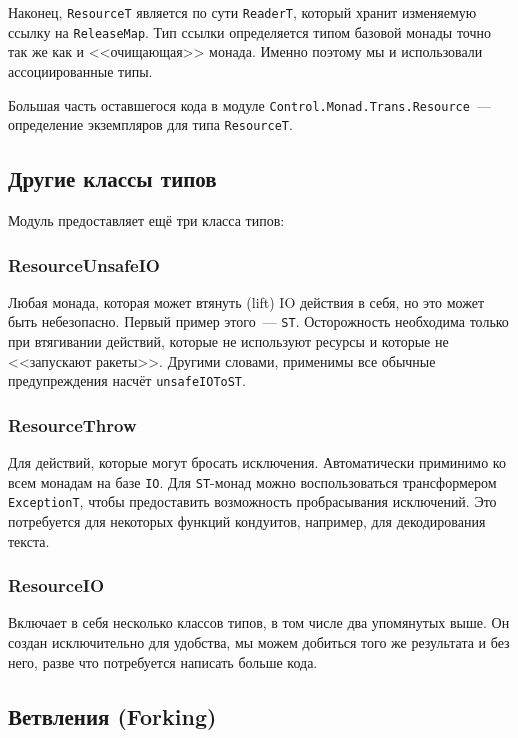 {Наконец, \lstinline'ResourceT' является по сути \lstinline'ReaderT', который
хранит изменяемую
ссылку на \lstinline'ReleaseMap'. Тип ссылки определяется типом базовой монады точно так же как и <<очищающая>> монада. Именно поэтому мы и использовали ассоциированные типы.

Большая часть оставшегося кода в модуле \lstinline'Control.Monad.Trans.Resource'~---
определение экземпляров для типа \lstinline'ResourceT'.

\subsection{Другие классы типов}

Модуль предоставляет ещё три класса типов:
   
\subsubsection{ResourceUnsafeIO}
Любая монада, которая может втянуть (lift) IO действия в себя, но это может быть небезопасно.
Первый пример этого~--- \lstinline'ST'. Осторожность необходима только при втягивании действий, которые не используют ресурсы и которые не <<запускают ракеты>>.
Другими словами, применимы все обычные предупреждения насчёт \lstinline'unsafeIOToST'.
  
\subsubsection{ResourceThrow}

Для действий, которые могут бросать исключения. Автоматически приминимо ко всем
монадам на базе \lstinline{IO}. Для \lstinline{ST}-монад можно воспользоваться трансформером
\lstinline'ExceptionT', чтобы
предоставить возможность пробрасывания исключений. Это потребуется для некоторых функций
кондуитов, например, для декодирования текста.
   
\subsubsection{ResourceIO}

Включает в себя несколько классов типов, в том числе два
упомянутых выше. Он создан исключительно для удобства, мы можем добиться того же результата и без него,
разве что потребуется написать больше кода.
   
\subsection{Ветвления (Forking)}

}
